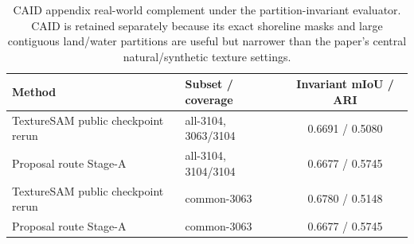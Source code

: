 \begin{table}[t]
\centering
\scriptsize
\begin{tabularx}{\textwidth}{@{}Xlc@{}}
\toprule
Method & Subset / coverage & Invariant mIoU / ARI \\
\midrule
TextureSAM public checkpoint rerun & all-3104, 3063/3104 & 0.6691 / 0.5080 \\
Proposal route Stage-A & all-3104, 3104/3104 & 0.6677 / 0.5745 \\
TextureSAM public checkpoint rerun & common-3063 & 0.6780 / 0.5148 \\
Proposal route Stage-A & common-3063 & 0.6677 / 0.5745 \\
\bottomrule
\end{tabularx}
\caption{CAID appendix real-world complement under the partition-invariant evaluator. CAID is retained separately because its exact shoreline masks and large contiguous land/water partitions are useful but narrower than the paper's central natural/synthetic texture settings.}
\label{tab:caid_secondary}
\end{table}
